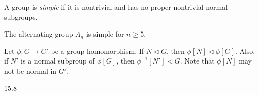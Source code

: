 \begin{definition}
    A group is \emph{simple} if it is nontrivial and has no proper nontrivial normal subgroups.
\end{definition}
\begin{remark}
    The alternating group $A_n$ is simple for $n\geq 5.$
\end{remark}
\begin{theorem}
    Let $\phi\colon G\to G'$ be a group homomorphism. If $N \vartriangleleft G$, then $\phi[N] \vartriangleleft \phi[G].$ Also, if $N'$ is a normal subgroup of $\phi[G]$, then $\phi^{-1}[N'] \vartriangleleft G$. Note that $\phi[N]$ may not be normal in $G'$.
\end{theorem}
\begin{theorem}
    15.8
\end{theorem}